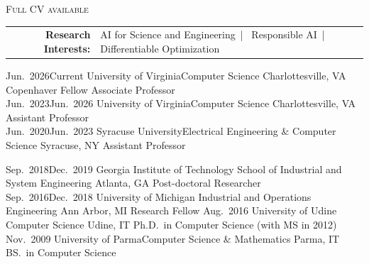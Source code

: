 \documentclass[localFont,alternative]{documentMETADATA}
\begin{document}
\makecvheader\sloppy\allowdisplaybreaks


	\makecvfooter
		{\textsc{}} %
		{\textsc{Full CV available  }}
		{\thepage}


	\begin{tabular}{r l} 
	{\bf Research Interests:} &
	{AI for Science and Engineering}~|~
	{Responsible AI}~|~
	{Differentiable Optimization}
	\end{tabular}



\vspace{-6pt}
\begin{experiences}
  \job
    {Jun.~2026}{Current}
    {University of Virginia}{Computer Science}
    {Charlottesville, VA}
    {Copenhaver Fellow Associate Professor}\\[-10pt]
  \job
    {Jun.~2023}{Jun.~2026}
    {University of Virginia}{Computer Science}
    {Charlottesville, VA}
    {Assistant Professor}\\[-10pt]
  \job
    {Jun.~2020}{Jun.~2023}
    {Syracuse University}{Electrical Engineering \& Computer Science}
    {Syracuse, NY}
    {Assistant Professor}
\end{experiences}

\vspace{-2pt}
\vspace{-6pt}
\begin{experiences}
  \job
    {Sep.~2018}{Dec.~2019}
    {Georgia Institute of Technology}
    {School of Industrial and System Engineering}
    {Atlanta, GA}
    {Post-doctoral Researcher}\\[-10pt]
  \job
    {Sep.~2016}{Dec.~2018}
    {University of Michigan}
    {Industrial and Operations Engineering}
    {Ann Arbor, MI}
    {Research Fellow}
  \job
    {}{Aug.~2016}
    {University of Udine}%
    {Computer Science}
    {Udine, IT}
    {Ph.D.~in Computer Science (with MS in 2012)}
  \job
    {}{Nov.~2009}
    {University of Parma}{Computer Science \& Mathematics}
    {Parma, IT}
    {BS.~in Computer Science}
\end{experiences}
\end{document}
